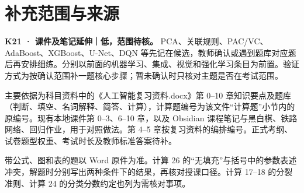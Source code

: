 \documentclass[UTF8,a4paper,11pt]{ctexart}
\begin{document}
\section{补充范围与来源}
\textbf{K21 · 课件及笔记延伸｜低，范围待核。} PCA、关联规则、PAC/VC、AdaBoost、XGBoost、U-Net、DQN 等先记在候选，教师确认或遇到题库对应题后再安排细练。分别以前面的机器学习、集成、视觉和强化学习条目为前置。验证方式为按确认范围补一题核心步骤；暂未确认时只核对主题是否在考试范围。

主要依据为科目资料中的《人工智能复习资料.docx》第 0–10 章知识要点及题库（判断、填空、名词解释、简答、计算），计算题编号为该文件“计算题”小节内的原编号。现有本地课件第 0–3、6–10 章，以及 Obsidian 课程笔记与黑白棋、铁路网络、回归作业，用于对照做法。第 4–5 章按复习资料的编排编号。正式考纲、试卷题型权重、考试时长及教师标准答案待补。

带公式、图和表的题以 Word 原件为准。计算 26 的“无填充”与括号中的参数表述冲突，解题时分别写出两种条件下的结果，再核对授课口径。计算 17–18 的分裂准则、计算 24 的分类分数约定也列为需核对事项。
\end{document}
